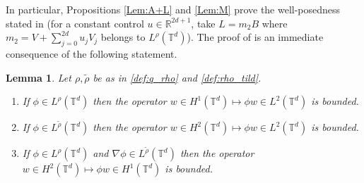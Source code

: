 \documentclass[a4paper]{article}
\theoremstyle{plain}
\newtheorem{lemma}[theorem]{Lemma}
\newcommand{\T}{\mathbb{T}}
\newcommand{\R}{\mathbb{R}}
\begin{document}
In particular, Propositions \ref{Lem:A+L} and \ref{Lem:M} prove the well-posedness stated in  (for a constant control $u \in \R^{2d+1}$, take $L=m_2 B$ where $m_2=V+\sum_{j=0}^{2d} u_j V_j$ belongs to $L^{\rho}(\T^d)$).
The proof of  is an immediate consequence of the following statement.

\begin{lemma} \label{Lem:Sob}
Let $\rho, \widetilde{\rho}$ be as in \eqref{def:q_rho} and \eqref{def:rho_tild}.
\begin{enumerate}[topsep=0cm, parsep=0cm, itemsep=0cm]
%
\item If $\phi \in L^{\rho}(\T^d)$ then the operator
$w \in H^1(\T^d) \mapsto \phi w \in L^2(\T^d)$ is bounded.
%
\item If $\phi \in L^{\widetilde{\rho}}(\T^d)$ then the operator
$w \in H^2(\T^d) \mapsto \phi w \in L^2(\T^d)$ is bounded.
%
\item If $\phi \in L^{\rho}(\T^d)$ and $\nabla \phi \in L^{\widetilde{\rho}}(\T^d)$ then the operator
$w \in H^2(\T^d) \mapsto \phi w \in H^1(\T^d)$ is bounded.
\end{enumerate}
\end{lemma}
\end{document}
